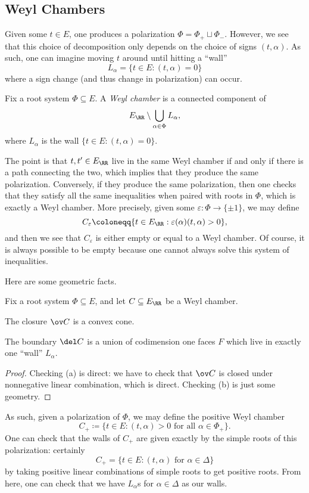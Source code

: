 \documentclass[../notes.tex]{subfiles}
\begin{document}
\subsection{Weyl Chambers}
Given some $t\in E$, one produces a polarization $\Phi=\Phi_+\sqcup\Phi_-$. However, we see that this choice of decomposition only depends on the choice of signs $(t,\alpha)$. As such, one can imagine moving $t$ around until hitting a ``wall''
\[L_\alpha=\{t\in E:(t,\alpha)=0\}\]
where a sign change (and thus change in polarization) can occur.
\begin{definition}
	Fix a root system $\Phi\subseteq E$. A \textit{Weyl chamber} is a connected component of
	\[E_\RR\setminus\bigcup_{\alpha\in\Phi}L_\alpha,\]
	where $L_\alpha$ is the wall $\{t\in E:(t,\alpha)=0\}$.
\end{definition}
The point is that $t,t'\in E_\RR$ live in the same Weyl chamber if and only if there is a path connecting the two, which implies that they produce the same polarization. Conversely, if they produce the same polarization, then one checks that they satisfy all the same inequalities when paired with roots in $\Phi$, which is exactly a Weyl chamber. More precisely, given some $\varepsilon\colon\Phi\to\{\pm1\}$, we may define
\[C_\varepsilon\coloneqq\{t\in E_\RR:\varepsilon(\alpha)(t,\alpha)>0\},\]
and then we see that $C_\varepsilon$ is either empty or equal to a Weyl chamber. Of course, it is always possible to be empty because one cannot always solve this system of inequalities.

Here are some geometric facts.
\begin{lemma}
	Fix a root system $\Phi\subseteq E$, and let $C\subseteq E_\RR$ be a Weyl chamber.
	\begin{listalph}
		\item The closure $\ov C$ is a convex cone.
		\item The boundary $\del C$ is a union of codimension one faces $F$ which live in exactly one ``wall'' $L_\alpha$.
	\end{listalph}
\end{lemma}
\begin{proof}
	Checking (a) is direct: we have to check that $\ov C$ is closed under nonnegative linear combination, which is direct. Checking (b) is just some geometry.
\end{proof}
As such, given a polarization of $\Phi$, we may define the positive Weyl chamber
\[C_+\coloneqq\{t\in E:(t,\alpha)>0\text{ for all }\alpha\in\Phi_+\}.\]
One can check that the walls of $C_+$ are given exactly by the simple roots of this polarization: certainly
\[C_+=\{t\in E:(t,\alpha)\text{ for }\alpha\in\Delta\}\]
by taking positive linear combinations of simple roots to get positive roots. From here, one can check that we have $L_\alpha$s for $\alpha\in\Delta$ as our walls.
\end{document}
